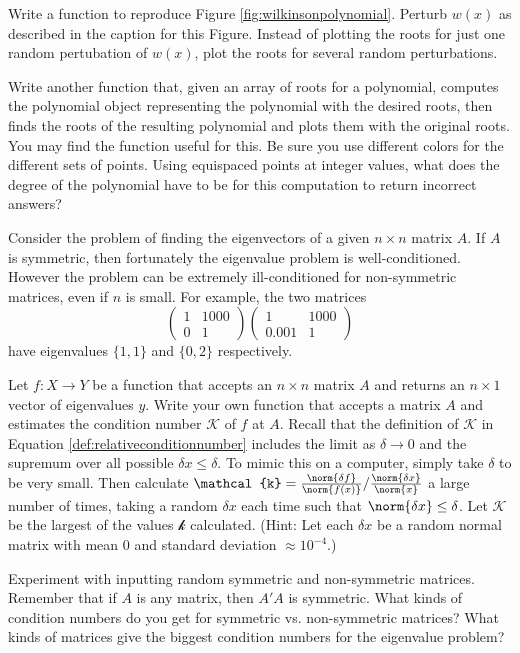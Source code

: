 \begin{problem}
Write a function to reproduce Figure \ref{fig:wilkinsonpolynomial}.
Perturb $w(x)$ as described in the caption for this Figure.
Instead of plotting the roots for just one random pertubation of $w(x)$, plot the roots for several random perturbations.

Write another function that, given an array of roots for a polynomial, computes the polynomial object representing the polynomial with the desired roots, then finds the roots of the resulting polynomial and plots them with the original roots.
You may find the  function useful for this.
Be sure you use different colors for the different sets of points.
Using equispaced points at integer values, what does the degree of the polynomial have to be for this computation to return incorrect answers?
\end{problem}

\begin{example}
Consider the problem of finding the eigenvectors of a given $n \times n$ matrix $A$. If $A$ is symmetric, then fortunately the eigenvalue problem is well-conditioned. However the problem can be extremely ill-conditioned for non-symmetric matrices, even if $n$ is small. For example, the two matrices 
\[ \left( \begin{array}{cc}
1 & 1000 \\
0 & 1
\end{array} \right)
%
\left( \begin{array}{cc}
1 & 1000 \\
0.001 & 1
\end{array} \right)
\]
have eigenvalues $\{ 1,1\}$ and $\{0,2 \}$ respectively.
\end{example}

\begin{problem}
Let $f:X\rightarrow Y$ be a function that accepts an $n\times n$ matrix $A$ and returns an $n \times 1$ vector of eigenvalues $y$. Write your own function that accepts a matrix $A$ and estimates the condition number $\mathcal{K}$ of $f$ at $A$. Recall that the definition of $\mathcal{K}$ in Equation \ref{def:relativeconditionnumber} includes the limit as $\delta \rightarrow 0$ and the supremum over all possible $\delta x \leq \delta$. To mimic this on a computer, simply take $\delta$ to be very small. Then calculate $\mathcal{k} =  { \frac{\norm{\delta f}}{\norm{f(x)}} } / { \frac{\norm{\delta x}}{\norm{x}} }$ a large number of times, taking a random $\delta x$ each time such that $\norm{\delta x} \leq \delta$. Let $\mathcal{K}$ be the largest of the values $\mathcal{k}$ calculated. (Hint: Let each $\delta x$ be a random normal matrix with mean $0$ and standard deviation $\approx 10^{-4}$.)

Experiment with inputting random symmetric and non-symmetric matrices. Remember that if $A$ is any matrix, then $A'A$ is symmetric. What kinds of condition numbers do you get for symmetric vs. non-symmetric matrices? What kinds of matrices give the biggest condition numbers for the eigenvalue problem?
\end{problem}


